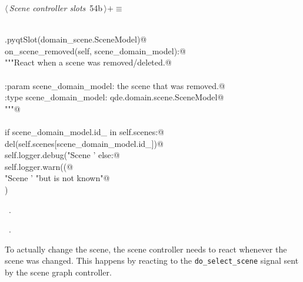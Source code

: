 \documentclass[
    a4paper,      %
    10pt,         %
    openright,    %
    notitlepage,  %
    parskip=half, %
]{scrreprt}       %
\theoremstyle{definition}                    %
\begin{document}
\begin{flushleft} \small
\begin{minipage}{\linewidth}\label{scrap85}\raggedright\small
{} $\langle\,${\itshape Scene controller slots}\nobreak\ {\footnotesize {54b}}$\,\rangle+\equiv$
\vspace{-1ex}
\begin{list}{}{} \item
\mbox{}\lstinline@@\\
\mbox{}\lstinline@QtCore.pyqtSlot(domain_scene.SceneModel)@\\
\mbox{}\lstinline@def on_scene_removed(self, scene_domain_model):@\\
\mbox{}\lstinline@    """React when a scene was removed/deleted.@\\
\mbox{}\lstinline@@\\
\mbox{}\lstinline@    :param scene_domain_model: the scene that was removed.@\\
\mbox{}\lstinline@    :type scene_domain_model:  qde.domain.scene.SceneModel@\\
\mbox{}\lstinline@    """@\\
\mbox{}\lstinline@@\\
\mbox{}\lstinline@    if scene_domain_model.id_ in self.scenes:@\\
\mbox{}\lstinline@        del(self.scenes[scene_domain_model.id_])@\\
\mbox{}\lstinline@        self.logger.debug("Scene '%s' was removed" % scene_domain_model)@\\
\mbox{}\lstinline@    else:@\\
\mbox{}\lstinline@        self.logger.warn((@\\
\mbox{}\lstinline@            "Scene '%s' should be removed, "@\\
\mbox{}\lstinline@            "but is not known"@\\
\mbox{}\lstinline@        ) % scene_domain_model)@\\
\mbox{}\lstinline@@{\NWsep}
\end{list}
\vspace{-1.5ex}
\footnotesize
\begin{list}{}{\setlength{\itemsep}{-\parsep}\setlength{\itemindent}{-\leftmargin}}
\item \NWtxtMacroDefBy\ .
\item \NWtxtMacroRefIn\ .

\item{}
\end{list}
\end{minipage}\vspace{4ex}
\end{flushleft}
To actually change the scene, the scene controller needs to react whenever the
scene was changed. This happens by reacting to the \verb+do_select_scene+
signal sent by the scene graph controller.
\end{document}
